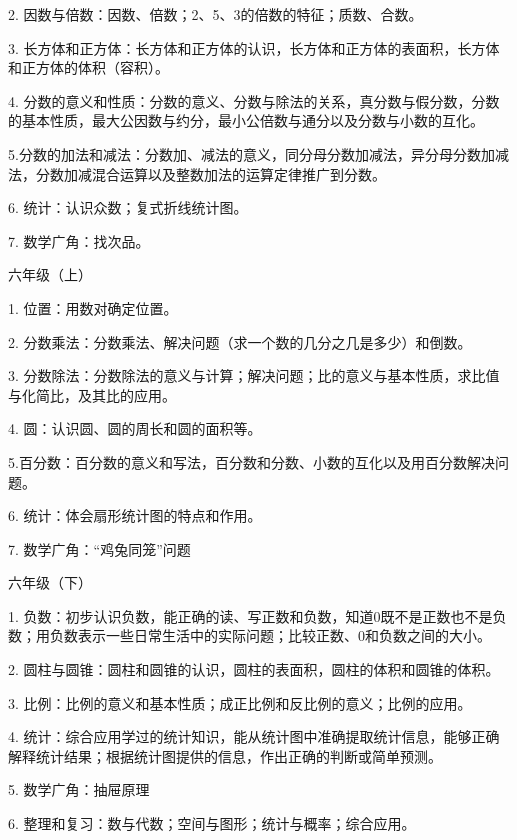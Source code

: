 2. 因数与倍数：因数、倍数；2、5、3的倍数的特征；质数、合数。

3. 长方体和正方体：长方体和正方体的认识，长方体和正方体的表面积，长方体和正方体的体积（容积）。

4. 分数的意义和性质：分数的意义、分数与除法的关系，真分数与假分数，分数的基本性质，最大公因数与约分，最小公倍数与通分以及分数与小数的互化。

5.分数的加法和减法：分数加、减法的意义，同分母分数加减法，异分母分数加减法，分数加减混合运算以及整数加法的运算定律推广到分数。

6. 统计：认识众数；复式折线统计图。

7. 数学广角：找次品。

六年级（上）

1. 位置：用数对确定位置。

2. 分数乘法：分数乘法、解决问题（求一个数的几分之几是多少）和倒数。

3. 分数除法：分数除法的意义与计算；解决问题；比的意义与基本性质，求比值与化简比，及其比的应用。

4. 圆：认识圆、圆的周长和圆的面积等。

5.百分数：百分数的意义和写法，百分数和分数、小数的互化以及用百分数解决问题。

6. 统计：体会扇形统计图的特点和作用。

7. 数学广角：“鸡兔同笼”问题

六年级（下）

1. 负数：初步认识负数，能正确的读、写正数和负数，知道0既不是正数也不是负数；用负数表示一些日常生活中的实际问题；比较正数、0和负数之间的大小。

2. 圆柱与圆锥：圆柱和圆锥的认识，圆柱的表面积，圆柱的体积和圆锥的体积。

3. 比例：比例的意义和基本性质；成正比例和反比例的意义；比例的应用。

4. 统计：综合应用学过的统计知识，能从统计图中准确提取统计信息，能够正确解释统计结果；根据统计图提供的信息，作出正确的判断或简单预测。

5. 数学广角：抽屉原理

6. 整理和复习：数与代数；空间与图形；统计与概率；综合应用。
